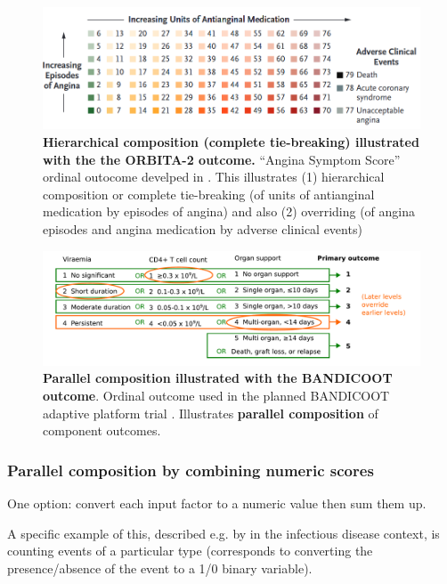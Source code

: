 \documentclass[
  11pt,
  fleqn
]{article}
\begin{document}
\begin{figure}
  \includegraphics[width=6in]{rajkumar_et_al_outcome.png}
  \caption{\textbf{Hierarchical composition (complete tie-breaking)
      illustrated with the
    the ORBITA-2 outcome.} ``Angina
    Symptom Score'' ordinal outocome develped in
    \citep{rajkumarPlaceboControlledTrialPercutaneous2023}. This illustrates
    (1) hierarchical composition or complete tie-breaking (of units
      of antianginal medication by
    episodes of angina) and also (2) overriding (of angina episodes and
  angina medication by adverse clinical events)}
  \label{fig:rajkumar_et_al_outcome}
\end{figure}

\begin{figure} \includegraphics[width=7in]{parallel_composition_bandicoot.pdf}
  \caption{\textbf{Parallel composition illustrated with the BANDICOOT outcome}.
    Ordinal outcome used in the planned BANDICOOT adaptive platform trial
    \citep{walkerCodesigningNovelOrdinal2025}. Illustrates \textbf{parallel
  composition} of component outcomes.} \label{fig:parallel_bandicoot}
\end{figure}

\subsubsection{Parallel composition by combining numeric scores}

One option: convert each input factor to a numeric value then sum them up.

A specific example of this, described e.g. by \citet{ongUnlockingDOORHow2023} in
the infectious disease context, is counting events of a particular
type (corresponds to converting the presence/absence of the event to
a 1/0 binary variable).
\end{document}
